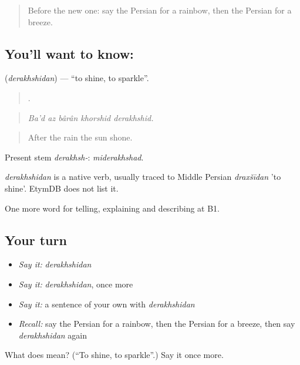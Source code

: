 \begin{quote}
Before the new one: say the Persian for a rainbow, then the Persian for a breeze.
\end{quote}

\subsection*{You'll want to know: }
\textbf{} (\emph{derakhshidan}) — \textquotedblleft{}to shine, to sparkle\textquotedblright{}.

\begin{quote}
    .
\end{quote}

\begin{quote}
\emph{Ba'd az bârân khorshid derakhshid.}
\end{quote}

\begin{quote}
After the rain the sun shone.
\end{quote}

Present stem \emph{derakhsh-}: \emph{miderakhshad}.

\begin{cousinweb}
\emph{derakhshidan} is a native verb, usually traced to Middle Persian \emph{draxšīdan} 'to shine'. EtymDB does not list it.
\end{cousinweb}

\begin{grammarlens}[title={What you've built}]
One more word for telling, explaining and describing at B1.
\end{grammarlens}

\subsection*{Your turn}
\begin{itemize}
\raggedright
  \item \emph{Say it:} \emph{derakhshidan}
  \item \emph{Say it:} \emph{derakhshidan}, once more
  \item \emph{Say it:} a sentence of your own with \emph{derakhshidan}
  \item \emph{Recall:} say the Persian for a rainbow, then the Persian for a breeze, then say \emph{derakhshidan} again
\end{itemize}

\begin{tcolorbox}[breakable,colback=teal!4,colframe=teal!35!black,title={Before you move on}]
What does  mean? (\textquotedblleft{}To shine, to sparkle\textquotedblright{}.) Say it once more.
\end{tcolorbox}
